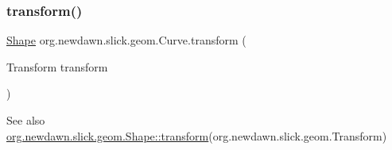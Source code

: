 \subsubsection{\texorpdfstring{transform()}{transform()}}
{\footnotesize\ttfamily \mbox{\hyperlink{classorg_1_1newdawn_1_1slick_1_1geom_1_1_shape}{Shape}} org.\+newdawn.\+slick.\+geom.\+Curve.\+transform (\begin{DoxyParamCaption}\item[{Transform}]{transform }\end{DoxyParamCaption})\hspace{0.3cm}{\ttfamily [inline]}}

\begin{DoxySeeAlso}{See also}
\mbox{\hyperlink{classorg_1_1newdawn_1_1slick_1_1geom_1_1_shape_a463826a085479c379e40f012e970b997}{org.\+newdawn.\+slick.\+geom.\+Shape\+::transform}}(org.\+newdawn.\+slick.\+geom.\+Transform) 
\end{DoxySeeAlso}

